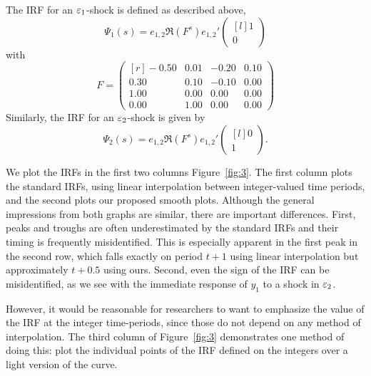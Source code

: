 \documentclass[12pt,fleqn]{article}
\begin{document}
The IRF for an $\varepsilon_1$-shock is defined as described above,
\begin{equation*}
  \Psi_1(s) = e_{1,2} \Re(F^s) e_{1,2}'
  \begin{pmatrix*}[l]
    1 \\ 0
  \end{pmatrix*}
\end{equation*}
with
\begin{equation*}
F = \begin{pmatrix*}[r]
    - 0.50 & 0.01 & -0.20 & 0.10 \\
      0.30 & 0.10 & -0.10 & 0.00 \\
      1.00 & 0.00 & 0.00 & 0.00 \\
      0.00 & 1.00 & 0.00 & 0.00
  \end{pmatrix*}
\end{equation*}
Similarly, the IRF for an $\varepsilon_2$-shock is given by
\begin{equation*}
  \Psi_2(s) = e_{1,2} \Re(F^s) e_{1,2}'
  \begin{pmatrix*}[l]
    0 \\ 1
  \end{pmatrix*}.
\end{equation*}

We plot the IRFs in the first two columns Figure~\ref{fig:3}. The
first column plots the standard IRFs, using linear interpolation
between integer-valued time periods, and the second plots our proposed
smooth plots. Although the general impressions from both graphs are
similar, there are important differences. First, peaks and troughs are
often underestimated by the standard IRFs and their timing is
frequently misidentified. This is especially apparent in the first
peak in the second row, which falls exactly on period $t+1$ using
linear interpolation but approximately $t+0.5$ using ours.  Second,
even the sign of the IRF can be misidentified, as we see with the
immediate response of $y_{1}$ to a shock in $\varepsilon_{2}$.

However, it would be reasonable for researchers to want to emphasize
the value of the IRF at the integer time-periods, since those do not
depend on any method of interpolation. The third column of
Figure~\ref{fig:3} demonstrates one method of doing this: plot the
individual points of the IRF defined on the integers over a light
version of the curve.
\end{document}
